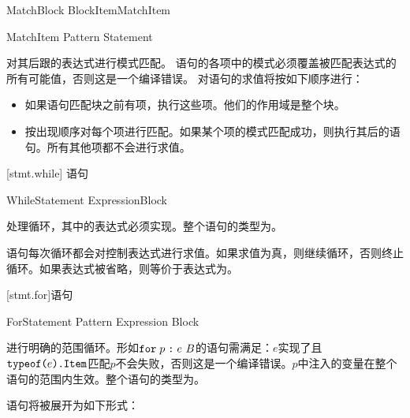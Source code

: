 \begin{bnf}{MatchBlock}
    \terminal{\{} BlockItem\bnfs MatchItem\bnfp \terminal{\}}
\end{bnf}

\begin{bnf}{MatchItem}
    Pattern \terminal{->} Statement
\end{bnf}

\pnum
{}对其后跟的表达式进行模式匹配。
语句的各项中的模式必须覆盖被匹配表达式的所有可能值，否则这是一个编译错误。
对语句的求值将按如下顺序进行：

\begin{itemize}
    \item 如果语句匹配块之前有项，执行这些项。他们的作用域是整个块。
    \item 按出现顺序对每个项进行匹配。如果某个项的模式匹配成功，则执行其后的语句。所有其他项都不会进行求值。
\end{itemize}

[stmt.while]{ 语句}

\begin{bnf}{WhileStatement}
     Expression\bnfq Block
\end{bnf}

\pnum
{}处理循环，其中的表达式必须实现。整个语句的类型为。

\pnum
{}语句每次循环都会对控制表达式进行求值。如果求值为真，则继续循环，否则终止循环。如果表达式被省略，则等价于表达式为。

[stmt.for]{语句}

\begin{bnf}{ForStatement}
     Pattern \terminal{:} Expression Block
\end{bnf}

\pnum
{}进行明确的范围循环。形如$\mathrel{\tcode{for}} p\mathrel{\tcode{:}} e\ B$的语句需满足：$e$实现了且
$\texttt{typeof(}e\texttt{).Item}$匹配$p$不会失败，否则这是一个编译错误。$p$中注入的变量在整个语句的范围内生效。整个语句的类型为。

\pnum
{}语句将被展开为如下形式：

\begin{codeblock}
{
    let mut \{$i$} = \{$e$}.iterator;

    while let \{$v$} = \{$i$}.next(); \{$v$} != nil {
        \{$p$} = \{$v$};
        \{$B$}
    }
}
\end{codeblock}

